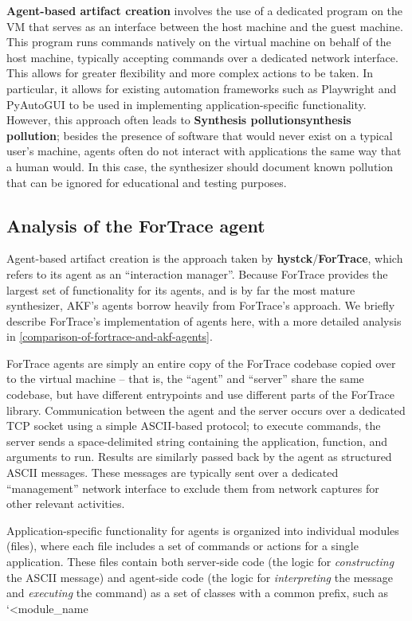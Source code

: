 \textbf{Agent-based artifact creation} involves the use of a dedicated
program on the VM that serves as an interface between the host machine
and the guest machine. This program runs commands natively on the
virtual machine on behalf of the host machine, typically accepting
commands over a dedicated network interface. This allows for greater
flexibility and more complex actions to be taken. In particular, it
allows for existing automation frameworks such as Playwright and
PyAutoGUI to be used in implementing application-specific functionality.
However, this approach often leads to \textbf{Synthesis
pollution\textbar synthesis pollution}; besides the presence of software
that would never exist on a typical user's machine, agents often do not
interact with applications the same way that a human would. In this
case, the synthesizer should document known pollution that can be
ignored for educational and testing purposes.

\subsection{Analysis of the ForTrace
agent}\label{analysis-of-the-fortrace-agent}

Agent-based artifact creation is the approach taken by
\textbf{hystck}/\textbf{ForTrace}, which refers to its agent as an
``interaction manager''. Because ForTrace provides the largest set of
functionality for its agents, and is by far the most mature synthesizer,
AKF's agents borrow heavily from ForTrace's approach. We briefly
describe ForTrace's implementation of agents here, with a more detailed
analysis in \autoref{comparison-of-fortrace-and-akf-agents}.

ForTrace agents are simply an entire copy of the ForTrace codebase
copied over to the virtual machine -- that is, the ``agent'' and
``server'' share the same codebase, but have different entrypoints and
use different parts of the ForTrace library. Communication between the
agent and the server occurs over a dedicated TCP socket using a simple
ASCII-based protocol; to execute commands, the server sends a
space-delimited string containing the application, function, and
arguments to run. Results are similarly passed back by the agent as
structured ASCII messages. These messages are typically sent over a
dedicated ``management'' network interface to exclude them from network
captures for other relevant activities.

Application-specific functionality for agents is organized into
individual modules (files), where each file includes a set of commands
or actions for a single application. These files contain both
server-side code (the logic for \emph{constructing} the ASCII message)
and agent-side code (the logic for \emph{interpreting} the message and
\emph{executing} the command) as a set of classes with a common prefix,
such as `\textless module\_name

